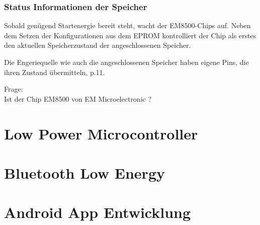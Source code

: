 \subsubsection{Status Informationen der Speicher}

Sobald genügend Startenergie bereit steht, wacht der EM8500-Chips auf. Neben dem Setzen der Konfigurationen aus dem EPROM kontrolliert der Chip als erstes den aktuellen Speicherzustand der angeschlossenen Speicher.

Die Engeriequelle wie auch die angeschlossenen Speicher haben eigene Pins, die ihren Zustand übermitteln\cite{datasheet_EM85}, p.11. 


Frage:\\

Ist der Chip EM8500 von EM Microelectronic ?\\

\section{Low Power Microcontroller }

\section{Bluetooth Low Energy}

\section{Android App Entwicklung}



